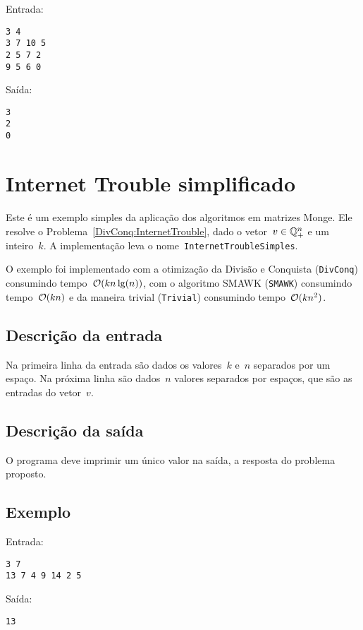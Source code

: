 Entrada:
\begin{verbatim}
3 4
3 7 10 5
2 5 7 2
9 5 6 0
\end{verbatim}
Saída:
\begin{verbatim}
3
2
0
\end{verbatim}

\section{Internet Trouble simplificado} \label{InternetTroubleSimples}

Este é um exemplo simples da aplicação dos algoritmos em matrizes Monge. Ele resolve o Problema~\ref{DivConq:InternetTrouble}, dado o vetor~$v \in \mathbb{Q}^{n}_+$ e um inteiro~$k$. A implementação leva o nome~\texttt{InternetTroubleSimples}.

O exemplo foi implementado com a otimização da Divisão e Conquista (\texttt{DivConq}) consumindo tempo~$\mathcal{O}(kn\lg(n))$, com o algoritmo SMAWK (\texttt{SMAWK}) consumindo tempo~$\mathcal{O}(kn)$ e da maneira trivial (\texttt{Trivial}) consumindo tempo~$\mathcal{O}(kn^2)$.

\subsection*{Descrição da entrada}

Na primeira linha da entrada são dados os valores~$k$ e~$n$ separados por um espaço. Na próxima linha são dados~$n$ valores separados por espaços, que são as entradas do vetor~$v$.

\subsection*{Descrição da saída}

O programa deve imprimir um único valor na saída, a resposta do problema proposto.

\subsection*{Exemplo}

Entrada:
\begin{verbatim}
3 7
13 7 4 9 14 2 5
\end{verbatim}
Saída:
\begin{verbatim}
13
\end{verbatim}


